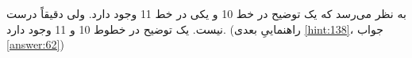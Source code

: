 \section{}
\paragraph{}\label{hint:215}
به نظر می‌رسد که یک توضیح در خط 10 و یکی در خط 11 وجود دارد. ولی دقیقاً درست نیست. یک توضیح در خطوط 10 و 11 وجود دارد. (راهنماییِ بعدی \ref{hint:138}، جواب \ref{answer:62})